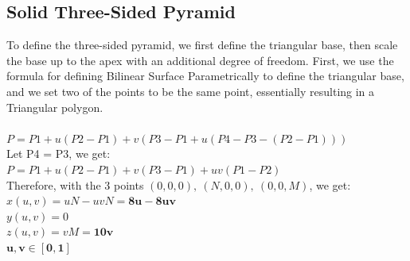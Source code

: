 \documentclass[acmlarge,nonacm=true]{acmart}
\begin{document}
\subsection{Solid Three-Sided Pyramid}
To define the three-sided pyramid, we first define the triangular base, then scale the base up to the apex with
an additional degree of freedom. First, we use the formula for defining Bilinear Surface Parametrically to 
define the triangular base, and we set two of the points to be the same point, essentially resulting in a 
Triangular polygon.\\\\
\(P = P1 + u(P2-P1) + v(P3-P1+u(P4-P3-(P2-P1)))\)\\
Let P4 = P3, we get:\\
\(P = P1 + u(P2 - P1) + v(P3 - P1) + uv(P1 - P2)\)\\
Therefore, with the 3 points \((0, 0, 0),\ (N, 0, 0),\ (0, 0, M)\), we get:\\
\(x(u,v) = uN - uvN = \mathbf{8u - 8uv}\)\\
\(y(u,v) = 0\)\\
\(z(u,v) = vM = \mathbf{10v}\)\\
\(\mathbf{u,v \in [0,1]}\)\\\\
\end{document}
